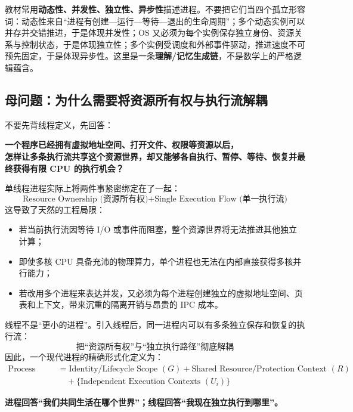 \documentclass[11pt,a4paper]{ctexart}
\newcommand{\kw}[1]{\textbf{#1}}
\begin{document}
\begin{exam}
教材常用\kw{动态性、并发性、独立性、异步性}描述进程。不要把它们当四个孤立形容词：动态性来自“进程有创建—运行—等待—退出的生命周期”；多个动态实例可以并存并交错推进，于是体现并发性；OS 又必须为每个实例保存独立身份、资源关系与控制状态，于是体现独立性；多个实例受调度和外部事件驱动，推进速度不可预先固定，于是体现异步性。这里是一条\kw{理解/记忆生成链}，不是数学上的严格逻辑蕴含。
\end{exam}

\subsection{母问题：为什么需要将资源所有权与执行流解耦}

不要先背线程定义，先回答：

\begin{center}
\bfseries 一个程序已经拥有虚拟地址空间、打开文件、权限等资源以后，\\
怎样让多条执行流共享这个资源世界，却又能够各自执行、暂停、等待、恢复并最终获得有限 CPU 的执行机会？
\end{center}

单线程进程实际上将两件事紧密绑定在了一起：
\[
\boxed{\text{Resource Ownership (资源所有权)} + \text{Single Execution Flow (单一执行流)}}
\]
这导致了天然的工程局限：
\begin{itemize}
\item 若当前执行流因等待 I/O 或事件而阻塞，整个资源世界将无法推进其他独立计算；
\item 即使多核 CPU 具备充沛的物理算力，单个进程也无法在内部直接获得多核并行能力；
\item 若改用多个进程来表达并发，又必须为每个进程创建独立的虚拟地址空间、页表和上下文，带来沉重的隔离开销与昂贵的 IPC 成本。
\end{itemize}

线程不是“更小的进程”。引入线程后，同一进程内可以有多条独立保存和恢复的执行流：
\[
\boxed{\text{把“资源所有权”与“独立执行路径”彻底解耦}}
\]
因此，一个现代进程的精确形式化定义为：
\[
\boxed{
\begin{aligned}
\text{Process Instance}
&=
\text{Identity/Lifecycle Scope }(G)
+
\text{Shared Resource/Protection Context }(R)\\
&\quad+
\{\text{Independent Execution Contexts }(U_i)\}
\end{aligned}
}
\]

\begin{corebox}[一句真言定乾坤]
\kw{进程回答“我们共同生活在哪个世界”；线程回答“我现在独立执行到哪里”。}
\end{corebox}
\end{document}
